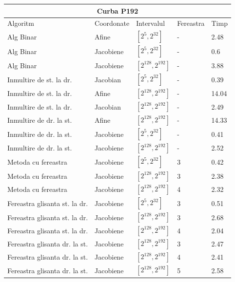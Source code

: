 \begin{tabular}{ |p{5cm}||p{3cm}|p{3cm}|p{2cm}|p{1cm}|  }
 \hline
 \multicolumn{5}{|c|}{Curba P192} \\
 \hline
 Algoritm& Coordonate &Intervalul &Fereastra &Timp\\
 \hline
 Alg Binar & Afine  &$[2^{5},2^{32}]$& - & 2.48\\
 Alg Binar&Jacobiene  & $[2^{5},2^{32}]$ & - & 0.6\\
 Alg Binar&Jacobiene  & $[2^{128},2^{192}]$ & - & 3.88\\
 Inmultire de st. la dr. & Jacobian & $[2^{5},2^{32}]$& - & 0.39\\
 Inmultire de st. la dr. & Afine & $[2^{128},2^{192}]$& - & 14.04\\
 Inmultire de st. la dr. & Jacobian & $[2^{128},2^{192}]$& - & 2.49\\
 Inmultire de dr. la st. &Afine & $[2^{128},2^{192}]$ & - & 14.33\\
 Inmultire de dr. la st. &Jacobiene & $[2^{5},2^{32}]$ & - & 0.41\\
 Inmultire de dr. la st. &Jacobiene & $[2^{128},2^{192}]$ & - & 2.52\\
 Metoda cu fereastra& Jacobiene & $[2^{5},2^{32}]$ & 3 & 0.42\\
 Metoda cu fereastra& Jacobiene & $[2^{128},2^{192}]$ & 3 & 2.38\\
 Metoda cu fereastra& Jacobiene & $[2^{128},2^{192}]$ & 4 & 2.32\\
 Fereastra glisanta st. la dr.& Jacobiene  & $[2^{5},2^{32}]$& 3 & 0.51\\
 Fereastra glisanta st. la dr.& Jacobiene  & $[2^{128},2^{192}]$& 3 & 2.68\\
  Fereastra glisanta st. la dr.& Jacobiene  & $[2^{128},2^{192}]$& 4 & 2.04\\
 Fereastra glisanta dr. la st.& Jacobiene  & $[2^{128},2^{192}]$& 3 & 2.47\\
 Fereastra glisanta dr. la st.& Jacobiene  & $[2^{128},2^{192}]$& 4 & 2.41\\
 Fereastra glisanta dr. la st.& Jacobiene  & $[2^{128},2^{192}]$& 5 & 2.58\\
 \hline
\end{tabular}

